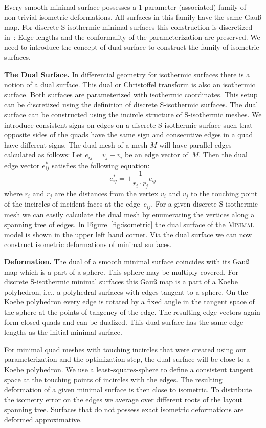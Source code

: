\documentclass[Thesis.tex]{subfiles}
\begin{document}
Every smooth minimal surface possesses a $1$-parameter (associated) family of
non-trivial isometric deformations. All surfaces in this family have the same
Gau{\ss} map. For discrete S-isothermic minimal surfaces this construction is
discretized in~\cite{BobHofSpr06}: Edge lengths and the conformality of the
parameterization are preserved. We need to introduce the concept of dual surface
to construct the family of isometric surfaces.

\noindent\textbf{The Dual Surface.}
In differential geometry for isothermic surfaces there is a notion of a dual
surface.  This dual or Christoffel transform is also an isothermic surface. Both
surfaces are parameterized with isothermic coordinates. This setup can be
discretized using the definition of discrete S-isothermic surfaces. The dual
surface can be constructed using the incircle structure of S-isothermic meshes.
We introduce consistent signs on edges on a discrete S-isothermic surface such
that opposite sides of the quads have the same sign and consecutive edges in a
quad have different signs. The dual mesh of a mesh $M$ will have parallel edges
calculated as follows: Let $e_{ij}=v_j-v_i$ be an edge vector of~$M$. Then the
dual edge vector $e_{ij}^*$ satisfies the following equation:
\[e_{ij}^* = \pm \frac{1}{r_i \cdot r_j} e_{ij}\]
where $r_i$ and $r_j$ are the distances from the vertex $v_i$ and $v_j$ to the
touching point of the incircles of incident faces at the edge~$e_{ij}$. For a
given
discrete S-isothermic mesh we can easily calculate the dual mesh by enumerating
the vertices along a spanning tree of edges. In Figure~\ref{fig:isometric} the
dual surface of the \textsc{Minimal} model is shown in the upper left hand
corner.  Via the dual surface we can now construct isometric deformations of
minimal surfaces.

\noindent\textbf{Deformation.}
The dual of a smooth minimal surface coincides with its Gau{\ss} map which is a
part of a sphere. This sphere may be multiply covered. For discrete S-isothermic
minimal surfaces this Gau{\ss} map is a part of a Koebe polyhedron, i.e., a
polyhedral surfaces with edges tangent to a sphere. On the Koebe polyhedron
every edge is rotated by a fixed angle in the tangent space of the sphere at the
points of tangency of the edge. The resulting edge vectors again form closed
quads and can be dualized. This dual surface has the same edge lengths as the
initial minimal surface.

For minimal quad meshes with touching incircles that were created using our
parameterization and the optimization step, the dual surface will be close to a
Koebe polyhedron. We use a least-squares-sphere to define a consistent tangent
space at the touching points of incircles with the edges. The resulting
deformation of a given minimal surface is then close to isometric. To distribute
the isometry error on the edges we average over different roots of the layout
spanning tree. Surfaces that do not possess exact isometric deformations are
deformed approximative.
\end{document}
